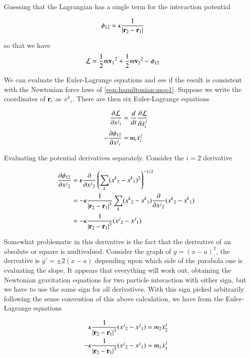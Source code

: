 Guessing that the Lagrangian has a single term for the interaction potential

\begin{align}\label{eqn:hamiltonian:moo2}
\phi_{12} &= \kappa \inv{\Abs{\Br_2 - \Br_1}} 
\end{align}

so that we have
\begin{align}\label{eqn:hamiltonian:moo3}
\LL &= \inv{2} m {\Bv_1}^2 +\inv{2} m {\Bv_2}^2 - \phi_{12}
\end{align}

We can evaluate the Euler-Lagrange equations and see if the result is consistent with the Newtonian force laws of \ref{eqn:hamiltonian:moo1}.  Suppose we write the coordinates of $\Br_i$ as ${x^k}_i$.  There are then six Euler-Lagrange equations 

\begin{align*}
\PD{{x^j}_i}{\LL} &= \frac{d}{dt} \PD{{\dot{x}^j}_i}{\LL} \\
-\PD{{x^j}_i}{\phi_{12}} &= m_i {\ddot{x}^j}_i
\end{align*}

Evaluating the potential derivatives separately.  Consider the $i=2$ derivative

\begin{align*}
\PD{{x^j}_2}{\phi_{12}}
&= 
\kappa \PD{{x^j}_2}{} \left( \sum_k ({x^k}_2 - {x^k}_1)^2 \right)^{-1/2} \\
&=
-\kappa \inv{\Abs{\Br_2 - \Br_1}^3} \sum_k ({x^k}_2 - {x^k}_1) \PD{{x^j}_2}{} ({x^k}_2 - {x^k}_1) \\
&=
-\kappa \inv{\Abs{\Br_2 - \Br_1}^3} ({x^j}_2 - {x^j}_1)
\end{align*}

Somewhat problematic in this derivative is the fact that the derivative of an absolute or square is multivalued.  Consider the graph of $y = (x-a)^2$, the derivative is $y' = \pm 2 (x-a)$ depending upon which side of the parabola one is evaluating the slope.  It appears that everything will work out, obtaining the Newtonian gravitation equations for two particle interaction with either sign, but we have to use the same sign for all derivatives.  With this sign picked arbitrarily following the sense convention of this above calculation, we have from the Euler-Lagrange equations

\begin{align}\label{eqn:hamiltonian:moo4}
\kappa \inv{\Abs{\Br_2 - \Br_1}^3} ({x^j}_2 - {x^j}_1) &= m_2 {\ddot{x}^j}_2 \\
-\kappa \inv{\Abs{\Br_2 - \Br_1}^3} ({x^j}_2 - {x^j}_1) &= m_1 {\ddot{x}^j}_1
\end{align}

